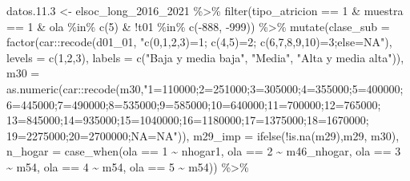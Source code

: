 \documentclass[
  12pt,
]{book}
\newenvironment{Shaded}{\begin{snugshade}}{\end{snugshade}}
\newcommand{\AttributeTok}[1]{\textcolor[rgb]{0.77,0.63,0.00}{#1}}
\newcommand{\DecValTok}[1]{\textcolor[rgb]{0.00,0.00,0.81}{#1}}
\newcommand{\FloatTok}[1]{\textcolor[rgb]{0.00,0.00,0.81}{#1}}
\newcommand{\FunctionTok}[1]{\textcolor[rgb]{0.00,0.00,0.00}{#1}}
\newcommand{\NormalTok}[1]{#1}
\newcommand{\OtherTok}[1]{\textcolor[rgb]{0.56,0.35,0.01}{#1}}
\newcommand{\SpecialCharTok}[1]{\textcolor[rgb]{0.00,0.00,0.00}{#1}}
\newcommand{\StringTok}[1]{\textcolor[rgb]{0.31,0.60,0.02}{#1}}
\begin{document}
\begin{Shaded}
\begin{Highlighting}[]
\NormalTok{datos.}\FloatTok{11.3} \OtherTok{\textless{}{-}}\NormalTok{ elsoc\_long\_2016\_2021 }\SpecialCharTok{\%\textgreater{}\%} 
  \FunctionTok{filter}\NormalTok{(tipo\_atricion }\SpecialCharTok{==} \DecValTok{1} \SpecialCharTok{\&}\NormalTok{ muestra }\SpecialCharTok{==} \DecValTok{1} \SpecialCharTok{\&}\NormalTok{ ola }\SpecialCharTok{\%in\%} \FunctionTok{c}\NormalTok{(}\DecValTok{5}\NormalTok{) }\SpecialCharTok{\&} \SpecialCharTok{!}\NormalTok{t01 }\SpecialCharTok{\%in\%} \FunctionTok{c}\NormalTok{(}\SpecialCharTok{{-}}\DecValTok{888}\NormalTok{, }\SpecialCharTok{{-}}\DecValTok{999}\NormalTok{)) }\SpecialCharTok{\%\textgreater{}\%} 
  \FunctionTok{mutate}\NormalTok{(}\AttributeTok{clase\_sub =} \FunctionTok{factor}\NormalTok{(car}\SpecialCharTok{::}\FunctionTok{recode}\NormalTok{(d01\_01, }\StringTok{"c(0,1,2,3)=1; c(4,5)=2; c(6,7,8,9,10)=3;else=NA"}\NormalTok{), }
                            \AttributeTok{levels =} \FunctionTok{c}\NormalTok{(}\DecValTok{1}\NormalTok{,}\DecValTok{2}\NormalTok{,}\DecValTok{3}\NormalTok{), }
                            \AttributeTok{labels =} \FunctionTok{c}\NormalTok{(}\StringTok{"Baja y media baja"}\NormalTok{, }\StringTok{"Media"}\NormalTok{, }\StringTok{"Alta y media alta"}\NormalTok{)),}
         \AttributeTok{m30 =} \FunctionTok{as.numeric}\NormalTok{(car}\SpecialCharTok{::}\FunctionTok{recode}\NormalTok{(m30,}\StringTok{"1=110000;2=251000;3=305000;4=355000;5=400000;}
\StringTok{                                           6=445000;7=490000;8=535000;9=585000;10=640000;11=700000;12=765000;}
\StringTok{                                           13=845000;14=935000;15=1040000;16=1180000;17=1375000;18=1670000;}
\StringTok{                                           19=2275000;20=2700000;NA=NA"}\NormalTok{)),}
         \AttributeTok{m29\_imp =} \FunctionTok{ifelse}\NormalTok{(}\SpecialCharTok{!}\FunctionTok{is.na}\NormalTok{(m29),m29, m30),}
         \AttributeTok{n\_hogar =} \FunctionTok{case\_when}\NormalTok{(ola }\SpecialCharTok{==} \DecValTok{1} \SpecialCharTok{\textasciitilde{}}\NormalTok{ nhogar1, ola }\SpecialCharTok{==} \DecValTok{2} \SpecialCharTok{\textasciitilde{}}\NormalTok{ m46\_nhogar,}
\NormalTok{                             ola }\SpecialCharTok{==} \DecValTok{3} \SpecialCharTok{\textasciitilde{}}\NormalTok{ m54, ola }\SpecialCharTok{==} \DecValTok{4} \SpecialCharTok{\textasciitilde{}}\NormalTok{ m54, ola }\SpecialCharTok{==} \DecValTok{5} \SpecialCharTok{\textasciitilde{}}\NormalTok{ m54)) }\SpecialCharTok{\%\textgreater{}\%}

\end{Highlighting}
\end{Shaded}
\end{document}
